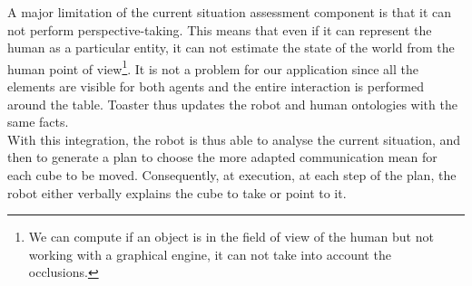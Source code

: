 A major limitation of the current situation assessment component is that it can not perform perspective-taking. This means that even if it can represent the human as a particular entity, it can not estimate the state of the world from the human point of view\footnote{We can compute if an object is in the field of view of the human but not working with a graphical engine, it can not take into account the occlusions.}. It is not a problem for our application since all the elements are visible for both agents and the entire interaction is performed around the table. Toaster thus updates the robot and human ontologies with the same facts. \\

With this integration, the robot is thus able to analyse the current situation, and then to generate a plan to choose the more adapted communication mean for each cube to be moved. Consequently, at execution, at each step of the plan, the robot either verbally explains the cube to take or point to it.